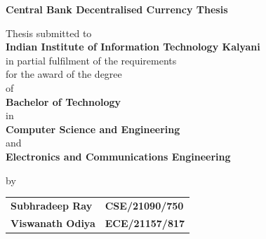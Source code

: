 \newpage
\thispagestyle{empty}
\cleardoublepage
\pagestyle{empty}
\vspace*{-1.75cm}
\begin{center}
  \begin{Large}
    {\textbf{Central Bank Decentralised Currency Thesis}}\\
  \end{Large}
\end{center}
\vspace{-0.3cm}
\begin{center}
  \begin{large}
    Thesis  submitted to \\
    \vspace{0.2cm}
    \large{\textbf{Indian Institute of Information Technology Kalyani}}\\
    \vspace{0.1cm}
    in partial fulfilment of the requirements\\
    \vspace{0.1cm}
    for the award of the degree\\
    \vspace{0.2cm}
    of\\
    \vspace{0.2cm}
    \textbf{Bachelor of Technology}
    \vspace{0.3cm}
    \\in\\
    \vspace{0.1cm}
 \textbf{Computer Science and Engineering}\\and\\ \textbf{Electronics and Communications Engineering}

  \end{large}
\end{center}

\vspace{-0.6cm}
\begin{center}
  \begin{large}
    by\\
    \begin{tabular}{ll}
\textbf{Subhradeep Ray} & \textbf{CSE/21090/750}\\
\textbf{Viswanath Odiya} & \textbf{ECE/21157/817}
\end{tabular}
  \end{large}
\end{center}

